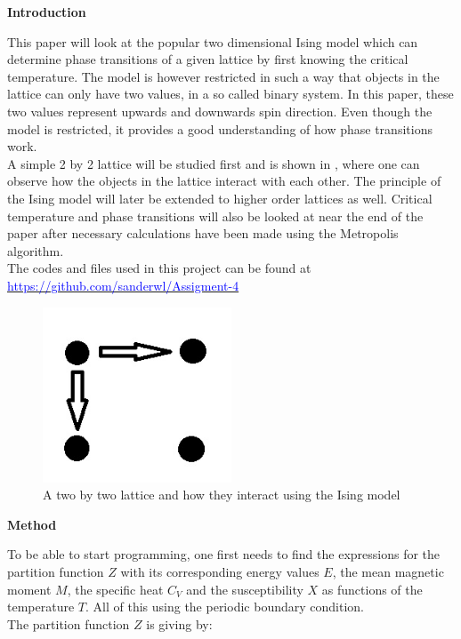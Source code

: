 \documentclass[10pt,a4paper]{article}
\begin{document}
\newpage

\begin{center}
{\LARGE\bf Introduction}
\end{center}

\noindent This paper will look at the popular two dimensional Ising model which can determine phase transitions of a given lattice by first knowing the critical temperature. The model is however restricted in such a way that objects in the lattice can only have two values, in a so called binary system. In this paper, these two values represent upwards and downwards spin direction. Even though the model is restricted, it provides a good understanding of how phase transitions work.
\\
A simple 2 by 2 lattice will be studied first and is shown in , where one can observe how the objects in the lattice interact with each other. The principle of the Ising model will later be extended to higher order lattices as well. Critical temperature and phase transitions will also be looked at near the end of the paper after necessary calculations have been made using the Metropolis algorithm.
\\
The codes and files used in this project can be found at \href{https://github.com/sanderwl/Assigment-4}{\textcolor{blue}{https://github.com/sanderwl/Assigment-4}}

\begin{figure}[H]
\centering
\includegraphics[width=0.5\textwidth]{22lattice}
\caption{A two by two lattice and how they interact using the Ising model}
\label{fig:22lattice}
\end{figure}

\newpage

\begin{center}
{\LARGE\bf Method}
\end{center}

\noindent To be able to start programming, one first needs to find the expressions for the partition function $Z$ with its corresponding energy values $E$, the mean magnetic moment $M$, the specific heat $C_V$ and the susceptibility $X$ as functions of the temperature $T$. All of this using the periodic boundary condition.
\\
The partition function $Z$ is giving by: 
\end{document}
